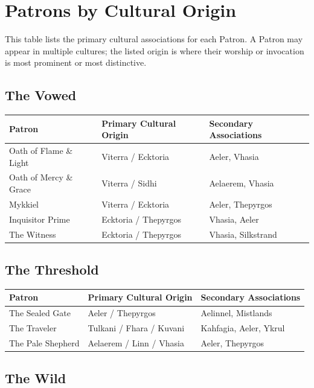  \section{Patrons by Cultural Origin}

This table lists the primary cultural associations for each Patron. A Patron may appear in multiple cultures; the listed origin is where their worship or invocation is most prominent or most distinctive.

\subsection{The Vowed}

\begin{longtable}{p{} p{} p{}}
\hline
\textbf{Patron} & \textbf{Primary Cultural Origin} & \textbf{Secondary Associations} \\
\hline
Oath of Flame \& Light & Viterra / Ecktoria & Aeler, Vhasia \\
Oath of Mercy \& Grace & Viterra / Sidhi & Aelaerem, Vhasia \\
Mykkiel & Viterra / Ecktoria & Aeler, Thepyrgos \\
Inquisitor Prime & Ecktoria / Thepyrgos & Vhasia, Aeler \\
The Witness & Ecktoria / Thepyrgos & Vhasia, Silkstrand \\
\hline
\end{longtable}

\subsection{The Threshold}

\begin{longtable}{p{} p{} p{}}
\hline
\textbf{Patron} & \textbf{Primary Cultural Origin} & \textbf{Secondary Associations} \\
\hline
The Sealed Gate & Aeler / Thepyrgos & Aelinnel, Mistlands \\
The Traveler & Tulkani / Fhara / Kuvani & Kahfagia, Aeler, Ykrul \\
The Pale Shepherd & Aelaerem / Linn / Vhasia & Aeler, Thepyrgos \\
\hline
\end{longtable}

\subsection{The Wild}

